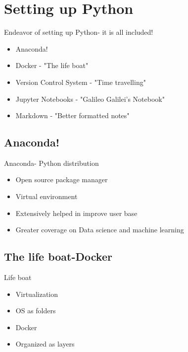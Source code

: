 \section[Setting up Python]{Setting up Python}

\begin{frame}{Endeavor of setting up Python- it is all included!}
	
	
	\begin{itemize}
		\item Anaconda!
		\item Docker
- "The life boat"
		\item Version Control System
- "Time travelling"
		\item Jupyter Notebooks
- "Galileo Galilei's Notebook"
		\item Markdown - "Better formatted notes"
	\end{itemize}

\end{frame}

\subsection[Anaconda!]{Anaconda!}

\begin{frame}{Anaconda- Python distribution}
	\begin{beamerboxesrounded}{}
		\begin{itemize}
			\item Open source package manager
			\item Virtual environment 
			\item Extensively helped in improve user base
			\item Greater coverage on Data science and machine learning 
		\end{itemize}
	\end{beamerboxesrounded}
\end{frame}


\subsection[The life boat-Docker]{The life boat-Docker}

\begin{frame}{Life boat}
	\begin{beamerboxesrounded}{}
		\begin{itemize}
			\item Virtualization
			\item OS as folders
			\item Docker 
			\item Organized as layers 
		\end{itemize}
	\end{beamerboxesrounded}
\end{frame}



